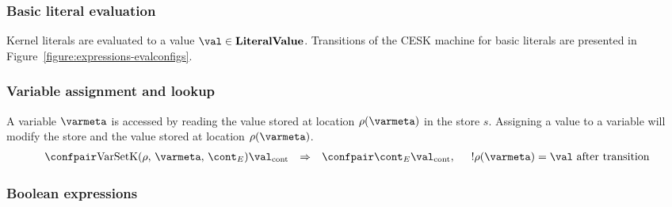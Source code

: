 \documentclass{article}
\begin{document}
\subsubsection{Basic literal evaluation}
\label{subsubsec:basic-literal-eval}

Kernel literals are evaluated to a value $\val \in \dlitval$.
Transitions of the CESK machine for basic literals are presented in Figure~\ref{figure:expressions-evalconfigs}.

\subsubsection{Variable assignment and lookup}
\label{subsubsec:variable-assignment-and-lookup}
A variable $\varmeta$ is accessed by reading the value stored at location $\env(\varmeta)$ in the store $s$.
Assigning a value to a variable will modify the store and the value stored at location  $\env(\varmeta)$.
\[
  \begin{array}{rcl}
	\cesktrans{
		\contconf{\VarSetK{\env}{\varmeta}{\econt}}{\val}}{
		\contconf{\econt}{\val}},
		\hspace{5mm} \deref{\env(\varmeta)} = \val
		\textrm{ after transition}
  \end{array}
\]

\subsubsection{Boolean expressions}
\label{subsubsec:bool-expressions}
\newcommand{\true}{\tt{true}}
\newcommand{\false}{\tt{false}}
\end{document}

